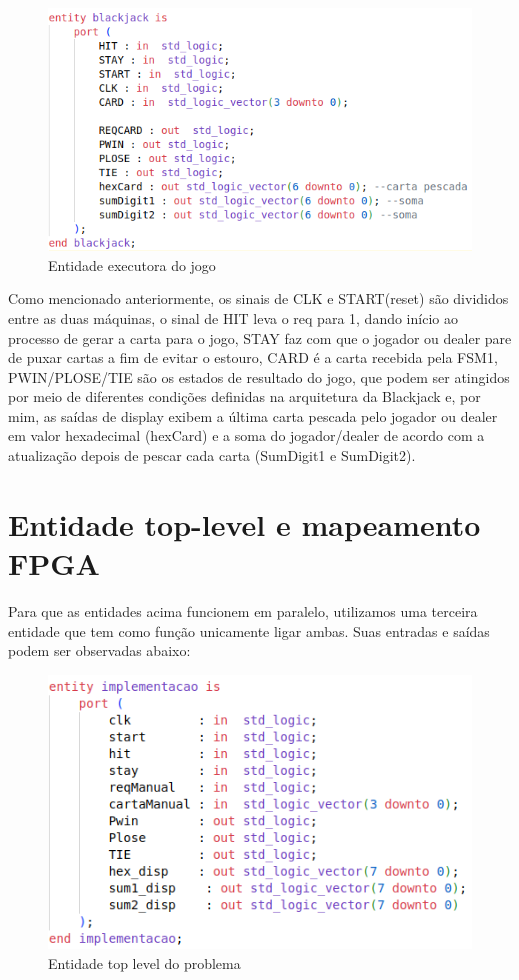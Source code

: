 \documentclass[oneside]{uffstex}
\begin{document}
\begin{figure}[H]
    \centering
    \includegraphics[width=0.9\linewidth]{blackjack.png}
    \caption{Entidade executora do jogo}
    \label{fig:blackjack_entity}
\end{figure}

Como mencionado anteriormente, os sinais de CLK e START(reset) são divididos entre as duas máquinas, o sinal de HIT leva o req para 1, dando início ao processo de gerar a carta para o jogo, STAY faz com que o jogador ou dealer pare de puxar cartas a fim de evitar o estouro, CARD é a carta recebida pela FSM1, PWIN/PLOSE/TIE são os estados de resultado do jogo, que podem ser atingidos por meio de diferentes condições definidas na arquitetura da Blackjack e, por mim, as saídas de display exibem a última carta pescada pelo jogador ou dealer em valor hexadecimal (hexCard) e a soma do jogador/dealer de acordo com a atualização depois de pescar cada carta (SumDigit1 e SumDigit2).

\section{Entidade top-level e mapeamento FPGA}
Para que as entidades acima funcionem em paralelo, utilizamos uma terceira entidade que tem como função unicamente ligar ambas. Suas entradas e saídas podem ser observadas abaixo:

\begin{figure}[H]
    \centering
    \includegraphics[width=0.9\linewidth]{top_blackjack.png}
    \caption{Entidade top level do problema}
    \label{fig:top_entity}
\end{figure}
\end{document}
